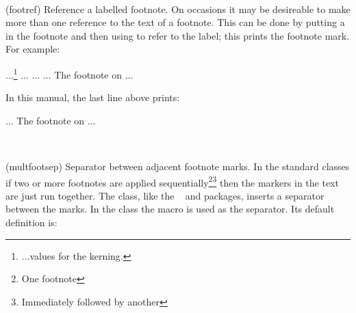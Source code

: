 \begin{syntax}
\cmd{\footref} \\
\end{syntax}
\glossary(footref)%
  {}%
  {Reference a labelled footnote.}
    On occasions it may be desireable to make more than one reference
to the text of a footnote. This can be done by 
putting a \cmd{\label} in the footnote and then using \cmd{\footref} to refer 
to the label; this prints the footnote mark. For example:
\begin{comment}
\begin{lcode}
...\footnote{... adults or babies.\label{fn:rabbits}}
...
... The footnote\footref{fn:rabbits} on \pref{fn:rabbits} ...
\end{lcode}
In this manual, the last line above prints:
\begin{syntax}
... The footnote\footref{fn:rabbits} on \pref{fn:rabbits} ... \\
\end{syntax}
\end{comment}
\begin{lcode}
...\footnote{...values for the kerning.\label{fn:kerning}} ...
...
... The footnote on  ... \\
\end{lcode}
In this manual, the last line above prints:
\begin{syntax}
... The footnote on  ... \\
\end{syntax}



\begin{syntax}
\cmd{\multfootsep} \\
\end{syntax}
\glossary(multfootsep)%
  {}%
  {Separator between adjacent footnote marks.}
In the standard classes if two or more footnotes are applied 
sequentially\footnote{One footnote}\footnote{Immediately followed by another}
then the markers in the text are just run together. The class, like the
~\cite{FOOTMISC} and  packages, inserts a 
separator
between the marks. In the class the macro \cmd{\multfootsep} is used as
the separator. Its default definition is:
\begin{lcode}
\newcommand*{\multfootsep}{\textsuperscript{\normalfont,}}
\end{lcode}

